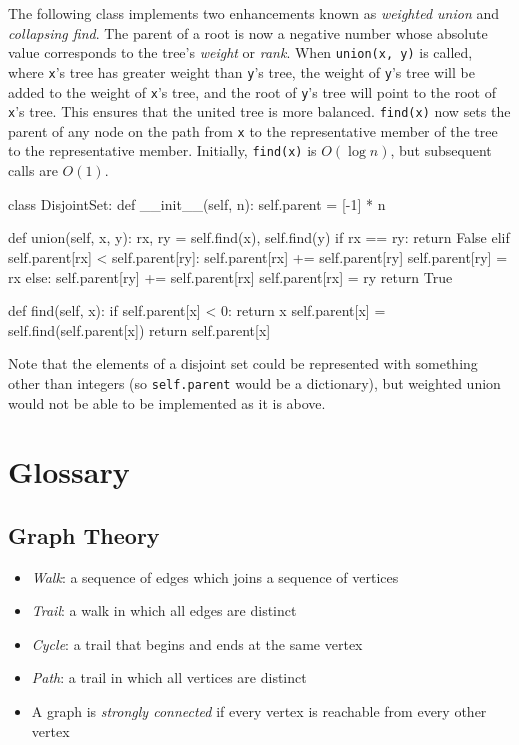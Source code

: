 \documentclass[12pt, titlepage]{article}
\begin{document}
The following class implements two enhancements known as \textit{weighted union} and \textit{collapsing find}. The parent of a root is now a negative number whose absolute value corresponds to the tree's \textit{weight} or \textit{rank}. When \texttt{union(x, y)} is called, where \texttt{x}'s tree has greater weight than \texttt{y}'s tree, the weight of \texttt{y}'s tree will be added to the weight of \texttt{x}'s tree, and the root of \texttt{y}'s tree will point to the root of \texttt{x}'s tree. This ensures that the united tree is more balanced. \texttt{find(x)} now sets the parent of any node on the path from \texttt{x} to the representative member of the tree to the representative member. Initially, \texttt{find(x)} is $O(\log n)$, but subsequent calls are $O(1)$.
\medskip
\begin{python}
class DisjointSet:
    def __init__(self, n):
        self.parent = [-1] * n

    def union(self, x, y):
        rx, ry = self.find(x), self.find(y)
        if rx == ry:
            return False
        elif self.parent[rx] < self.parent[ry]:
            self.parent[rx] += self.parent[ry]
            self.parent[ry] = rx
        else:
            self.parent[ry] += self.parent[rx]
            self.parent[rx] = ry
        return True

    def find(self, x):
        if self.parent[x] < 0:
            return x
        self.parent[x] = self.find(self.parent[x])
        return self.parent[x]
\end{python}
\bigskip

Note that the elements of a disjoint set could be represented with something other than integers (so \texttt{self.parent} would be a dictionary), but weighted union would not be able to be implemented as it is above.

\section{Glossary}

\subsection{Graph Theory}
\begin{itemize}
  \item \textit{Walk}: a sequence of edges which joins a sequence of vertices
  \item \textit{Trail}: a walk in which all edges are distinct
  \item \textit{Cycle}: a trail that begins and ends at the same vertex
  \item \textit{Path}: a trail in which all vertices are distinct
  \item A graph is \textit{strongly connected} if every vertex is reachable from every other vertex
\end{itemize}
\end{document}

